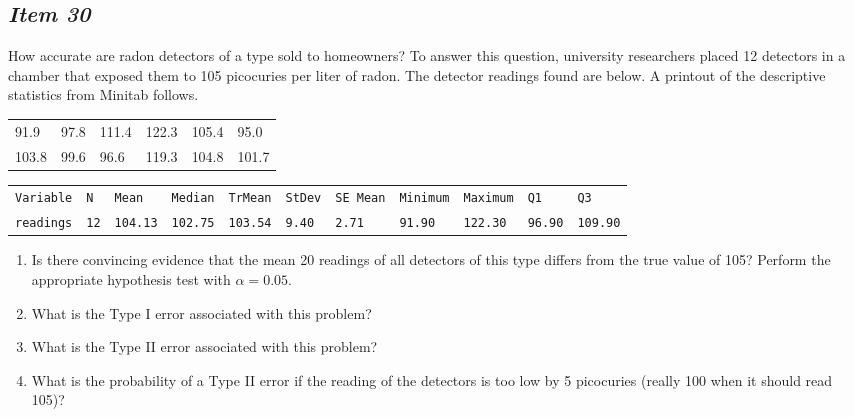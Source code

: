 \subsection{\textbf{\textit{Item 30}}}
How accurate are radon detectors of a type sold to homeowners?  To answer this question, university researchers placed 12 detectors in a chamber that exposed them to 105 picocuries per liter of radon.  The detector readings found are below.  A printout of the descriptive statistics from Minitab follows. 


\begin{table}[!ht]
\begin{center}
\begin{tabular}{llllll}
91.9	& 97.8 & 111.4 & 122.3 & 105.4 & 95.0\\
103.8 & 99.6 & 96.6 & 119.3 & 104.8 & 101.7\\
\end{tabular}
\end{center}
\end{table}

\begin{table}[!ht]
\begin{center}
\begin{tabular}{lllllllllll}
\texttt{Variable} & \texttt{N} & \texttt{Mean} & \texttt{Median} &    \texttt{TrMean} & \texttt{StDev} & \texttt{SE Mean} & \texttt{Minimum}  & \texttt{Maximum}      &   \texttt{Q1}   &      \texttt{Q3}\\
\texttt{readings} & \texttt{12} & \texttt{104.13} & \texttt{102.75} & \texttt{103.54} & \texttt{9.40} & \texttt{2.71} &      \texttt{91.90}  &  \texttt{122.30}   &   \texttt{96.90}   &  \texttt{109.90}\\
\end{tabular}
\end{center}
\end{table}

\renewcommand{\labelenumi}{\arabic{enumi}.}

\begin{enumerate}[leftmargin=1cm, itemsep=.2em]
\item Is there convincing evidence that the mean 20 readings of all detectors of this type differs from the true value of 105?  Perform the appropriate hypothesis test with $\alpha  = 0.05$.
\item What is the Type I error associated with this problem?
\item What is the Type II error associated with this problem?
\item What is the probability of a Type II error if the reading of the detectors is too low by 5 picocuries (really 100 when it should read 105)?
\end{enumerate}


